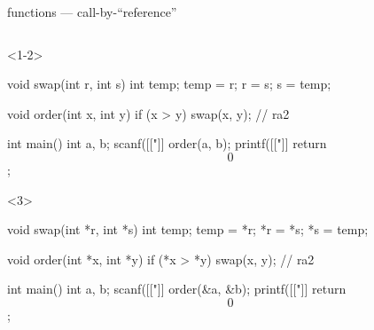 \documentclass[10pt,t,svgnames]{beamer}
\begin{document}
  \begin{frame}[fragile]{functions --- call-by-``reference''}
    \begin{columns}
      \begin{column}{.65\textwidth}
        \vspace{-20em} %
        \begin{scriptsize}
          \begin{onlyenv}<1-2>
            \begin{codeblock}[firstnumber=5, gobble=8]
              void swap(int r, int s) {
                int temp;
                temp = r;
                r = s;
                s = temp;
              }

              void order(int x, int y) {
                if (x > y) {
                  swap(x, y);
                } // ra2
              }

              int main() {
                int a, b;
                scanf([["]]%
                order(a, b);
                printf([["]]%
                return $$0$$;
              }
            \end{codeblock}
          \end{onlyenv}
          \begin{onlyenv}<3>
            \begin{codeblock}[firstnumber=5, gobble=8]
              void swap(int *r, int *s) {
                int temp;
                temp = *r;
                *r = *s;
                *s = temp;
              }

              void order(int *x, int *y) {
                if (*x > *y) {
                  swap(x, y);
                } // ra2
              }

              int main() {
                int a, b;
                scanf([["]]%
                order(&a, &b);
                printf([["]]%
                return $$0$$;
              }
            \end{codeblock}
          \end{onlyenv}
        \end{scriptsize}
      \end{column}


\end{columns}
\end{frame}
\end{document}
